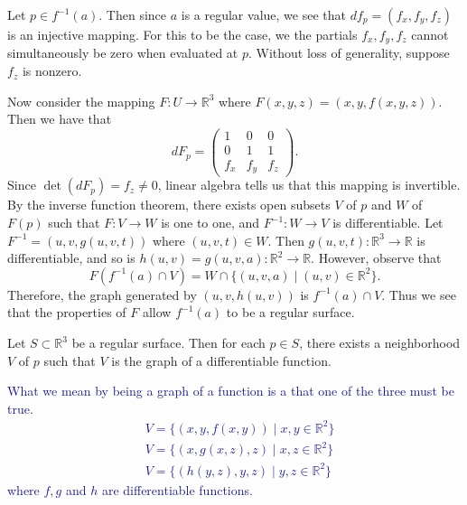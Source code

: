 \documentclass[12pt,letterpaper,boxed]{maths_v5}
\newcommand{\rr}{\mathbb{R}}
\theoremstyle{definition}
\begin{document}
\begin{prf}
    Let $p \in f^{-1}(a)$. Then since $a$ is a regular value, we see that 
    $df_p = (f_x, f_y, f_z)$ is an injective mapping. For this to be the case, 
    we the partials $f_x, f_y, f_z$ cannot simultaneously be zero when evaluated 
    at $p$. Without loss of generality, suppose $f_z$ is nonzero. 

    Now consider the mapping $F: U \to \rr^3$ where 
    $F(x, y, z) = (x, y, f(x, y, z))$. Then we have that 
    \[
        dF_p 
        = 
        \begin{pmatrix}
            1 & 0 & 0\\
            0 & 1 & 1\\
            f_x&f_y&f_z
        \end{pmatrix}.
    \]
    Since $\det(dF_p) = f_z \ne 0$, linear algebra tells us that this mapping is 
    invertible. By the inverse function theorem, there exists open subsets 
    $V$ of $p$ and $W$ of $F(p)$ such that $F: V \to W$ is one to one, and 
    $F^{-1}:W \to V$ is differentiable. Let $F^{-1} = (u, v, g(u, v, t))$ where 
    $(u, v, t) \in W$. Then $g(u, v, t): \rr^3 \to \rr$ is differentiable, 
    and so is $h(u, v) = g(u, v, a): \rr^2 \to \rr$. However, observe that 
    \[
        F(f^{-1}(a) \cap V) = W \cap \{(u, v, a) \mid (u, v) \in \rr^2\}.
    \]
    Therefore, the graph generated by $(u, v, h(u, v))$ is $f^{-1}(a)\cap V$. 
    Thus we see that the properties of $F$ allow $f^{-1}(a)$ to be a regular surface. 
\end{prf}

\begin{prop}
    Let $S \subset \rr^3$ be a regular surface. Then for each $p \in S$, there
    exists a neighborhood $V$ of $p$ such that $V$ is the graph of a differentiable function.
\end{prop}
\textcolor{MidnightBlue}{What we mean by being a graph of a function is a 
that one of the three must be true.
\begin{align*}
    &V = \{(x, y, f(x ,y)) \mid x, y \in \rr^2\}\\
    &V = \{(x, g(x, z), z) \mid x, z \in \rr^2\}\\
    &V = \{(h(y, z), y, z) \mid y, z \in \rr^2\}
\end{align*}
where $f, g$ and $h$ are differentiable functions.}
\end{document}
